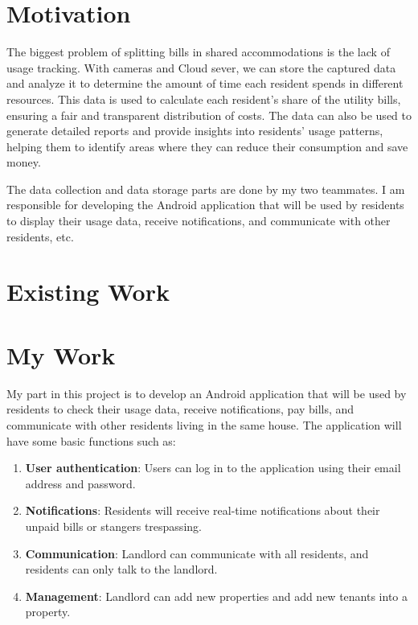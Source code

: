\documentclass[sigconf]{acmart}
\begin{document}
\section{Motivation}
The biggest problem of splitting bills in shared accommodations is the lack of usage tracking. With cameras and Cloud sever, we can store the captured data and analyze it to determine the amount of time each resident spends in different resources. This data is used to calculate each resident's share of the utility bills, ensuring a fair and transparent distribution of costs. The data can also be used to generate detailed reports and provide insights into residents' usage patterns, helping them to identify areas where they can reduce their consumption and save money.  

The data collection and data storage parts are done by my two teammates. I am responsible for developing the Android application that will be used by residents to display their usage data, receive notifications, and communicate with other residents, etc.

\section{Existing Work}

\section{My Work}
My part in this project is to develop an Android application that will be used by residents to check their usage data, receive notifications, pay bills, and communicate with other residents living in the same house. The application will have
some basic functions such as: 
\begin{enumerate}
  \item \textbf{User authentication}: Users can log in to the application using their email address and password.
  \item \textbf{Notifications}: Residents will receive real-time notifications about their unpaid bills or stangers trespassing. 
  \item \textbf{Communication}: Landlord can communicate with all residents, and residents can only talk to the landlord. 
  \item \textbf{Management}: Landlord can add new properties and add new tenants into a property.
\end{enumerate}
\end{document}

